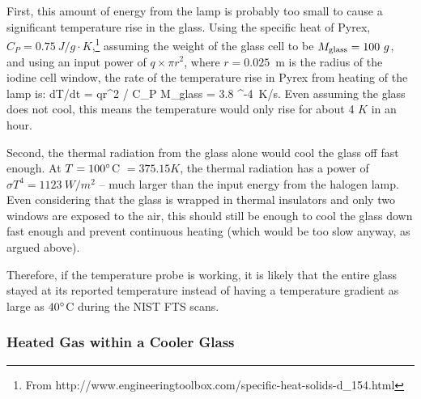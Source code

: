 First, this amount of energy from the lamp is probably too small to
cause a significant temperature rise in the glass. Using the specific
heat of Pyrex, $C_P = 0.75\ J/g\cdot K$,\footnote{From
http://www.engineeringtoolbox.com/specific-heat-solids-d\_154.html}
assuming the weight of the glass cell to be $M_{\rm glass} = 100\ g$,
and using an input power of $q \times \pi r^2$, where $r=0.025$~m is
the radius of the iodine cell window, the rate of the temperature rise
in Pyrex from heating of the lamp is:
\beq
dT/dt = q\cdot \pi r^2 / C_P M_{\rm glass} = 3.8 ^{-4}\ K/s.
\eeq
Even assuming the glass does not cool, this means the temperature would only rise
for about 4 $K$ in an hour. 

Second, the thermal radiation from the glass alone would cool the
glass off fast enough. At $T=100^{\circ}$C $= 375.15 K$, the thermal
radiation has a power of $\sigma T^4 = 1123\ W/m^2$ -- much larger than
the input energy from the halogen lamp. Even considering that the
glass is wrapped in thermal insulators and only two windows are
exposed to the air, this should still be enough to cool the glass down
fast enough and prevent continuous heating (which would be too slow
anyway, as argued above).

Therefore, if the temperature probe is working, it is likely that the
entire glass stayed at its reported temperature instead of having a
temperature gradient as large as $40^{\circ}$C during the NIST FTS
scans.

\subsubsection{Heated Gas within a Cooler Glass}

